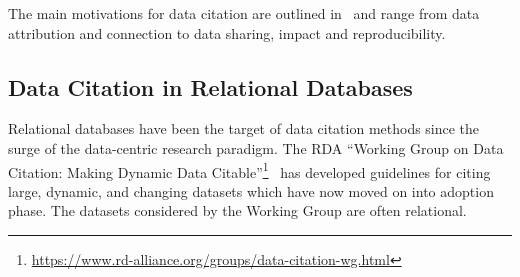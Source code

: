 \documentclass[preprint,12pt,sort&compress]{elsarticle}
\newcommand{\eat}[1]{}
\newcommand{\scream}[1]{{\bf * #1 *}{\typeout{#1}}}
\begin{document}
The main motivations for data citation are outlined in~\citep{Silvello18jasist} and range from data attribution and connection to data sharing, impact and reproducibility. 

\eat{
\scream{SBD: Is the next paragraph necessary?  Could we just say "The main motivations for data citation are outlined in~\citep{Silvello18jasist}."}
\scream{GMS: yes. done}

It is possible to outline six main motivations for data citation~\citep{Silvello18jasist}:
\begin{itemize}
	\item \emph{Data attribution}: identify the individuals that should be credited for data with variable granularity.
	\item \emph{Data connection}: connect papers to the data being used.
    \item \emph{Data Discovery}: citations helps to find data records and subsets that would be otherwise not findable via search engines.
    \item \emph{Data Sharing}: share data obtained by researchers within the whole community. 
    \item \emph{Data Impact}: highlight the results obtained in writing papers using specific data, the frequency and modality data were used.
    \item \emph{Reproducibility}: data citation greatly impacts the reproducibility of science~\citep{baggerly2010disclose}. Many authoritative journals ask to share data and provide valid methodologies to reproduce experiments.
\end{itemize}
}

\subsection{Data Citation in Relational Databases}
Relational databases have been the target of data citation methods since the surge of the data-centric research paradigm. 
The RDA ``Working Group on Data Citation: Making Dynamic Data Citable''\footnote{\url{https://www.rd-alliance.org/groups/data-citation-wg.html}}~\citep{RauberEtAl2016} has developed guidelines for citing large, dynamic, and changing datasets which have now moved on into adoption phase. The datasets considered by the Working Group are often relational.
\end{document}
